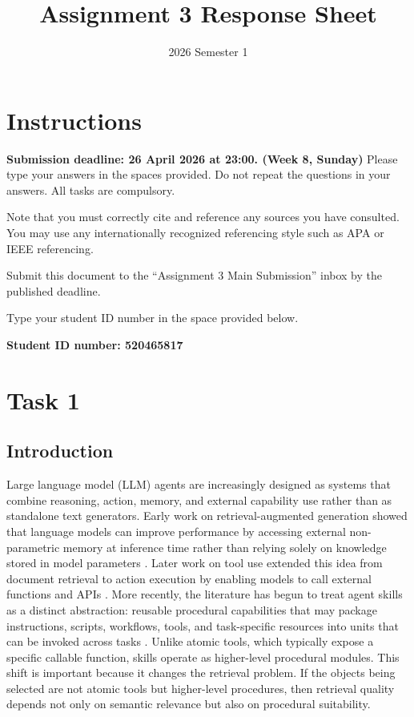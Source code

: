 \documentclass[a4paper]{article}
\title{Assignment 3 Response Sheet}
\date{2026 Semester 1}
\begin{document}
\maketitle

\section{Instructions}
\textbf{Submission deadline: 26 April 2026 at 23:00. (Week 8, Sunday)}
Please type your answers in the spaces provided. Do not repeat the questions in your answers. All tasks are compulsory.

Note that you must correctly cite and reference any sources you have consulted. You may use any internationally recognized referencing style such as APA or IEEE referencing.

Submit this document to the ``Assignment 3 Main Submission'' inbox by the published deadline.

Type your student ID number in the space provided below.

\textbf{Student ID number: 520465817}

\section{Task 1}
\subsection{Introduction}
Large language model (LLM) agents are increasingly designed as systems that combine reasoning, action, memory, and external capability use rather than as standalone text generators. Early work on retrieval-augmented generation showed that language models can improve performance by accessing external non-parametric memory at inference time rather than relying solely on knowledge stored in model parameters \cite{lewis2021rag, izacard2022atlas}. Later work on tool use extended this idea from document retrieval to action execution by enabling models to call external functions and APIs \cite{schick2023toolformer, patil2023gorilla, qin2023toolllm}. More recently, the literature has begun to treat agent skills as a distinct abstraction: reusable procedural capabilities that may package instructions, scripts, workflows, tools, and task-specific resources into units that can be invoked across tasks \cite{jiang2026procedural, jiang2026sok, anthropic2025skills}. Unlike atomic tools, which typically expose a specific callable function, skills operate as higher-level procedural modules. This shift is important because it changes the retrieval problem. If the objects being selected are not atomic tools but higher-level procedures, then retrieval quality depends not only on semantic relevance but also on procedural suitability.
\end{document}

